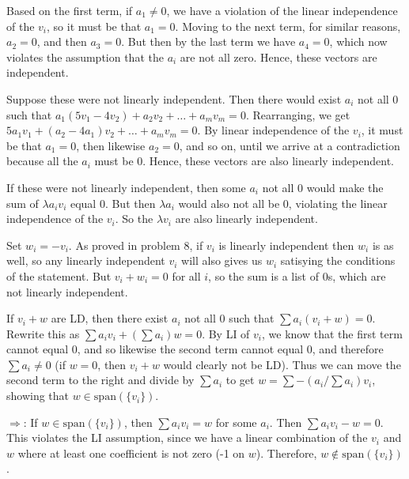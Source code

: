 \documentclass{article}
\begin{document}
Based on the first term, if $a_1 \neq 0$, we have a violation of the linear
independence of the $v_i$, so it must be that $a_1 = 0$. Moving to the next
term, for similar reasons, $a_2 = 0$, and then $a_3 = 0$. But then by the last
term we have $a_4 = 0$, which now violates the assumption that the $a_i$ are not
all zero. Hence, these vectors are independent.


Suppose these were not linearly independent. Then there would exist $a_i$ not
all 0 such that $a_1(5v_1 - 4v_2) + a_2v_2 + \ldots + a_mv_m = 0$. Rearranging,
we get $5a_1v_1 + (a_2 - 4a_1)v_2 + \ldots + a_mv_m = 0$. By linear independence
of the $v_i$, it must be that $a_1 = 0$, then likewise $a_2 = 0$, and so on,
until we arrive at a contradiction because all the $a_i$ must be 0. Hence, these
vectors are also linearly independent.


If these were not linearly independent, then some $a_i$ not all 0 would make
the sum of $\lambda a_iv_i$ equal 0. But then $\lambda a_i$ would also not all
be 0, violating the linear independence of the $v_i$. So the $\lambda v_i$ are
also linearly independent.


Set $w_i = -v_i$. As proved in problem 8, if $v_i$ is linearly independent then
$w_i$ is as well, so any linearly independent $v_i$ will also gives us $w_i$
satisying the conditions of the statement. But $v_i + w_i = 0$ for all $i$, so
the sum is a list of 0s, which are not linearly independent.


If $v_i + w$ are LD, then there exist $a_i$ not all 0 such that $\sum a_i(v_i +
w) = 0$. Rewrite this as $\sum a_iv_i + (\sum a_i)w = 0$. By LI of $v_i$, we
know that the first term cannot equal 0, and so likewise the second term cannot
equal 0, and therefore $\sum a_i \neq 0$ (if $w = 0$, then $v_i + w$ would
clearly not be LD). Thus we can move the second term to the right and divide by
$\sum a_i$ to get $w = \sum -(a_i / \sum a_i) v_i$, showing that $w \in
\text{span}(\{v_i\})$.


$\Rightarrow$: If $w \in \text{span}(\{v_i\})$, then $\sum a_iv_i = w$ for some
$a_i$. Then $\sum a_iv_i - w = 0$. This violates the LI assumption, since we
have a linear combination of the $v_i$ and $w$ where at least one coefficient is
not zero (-1 on $w$). Therefore, $w \notin \text{span}(\{v_i\})$.
\end{document}
